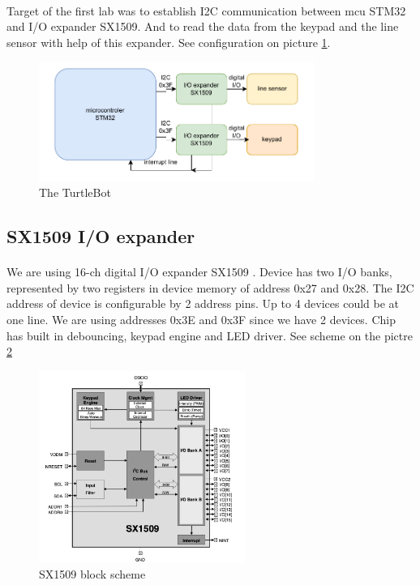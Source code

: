 \documentclass[english]{article}
\begin{document}
	\paragraph{}
	Target of the first lab was to establish I2C communication between mcu STM32 and I/O expander SX1509. And to read
	the data from the keypad and the line sensor with help of this expander. See configuration on picture \ref{fig.lab1.config}.

	\begin{figure}[H]
		\centering
		\includegraphics[width=0.8\textwidth]{figures/config_stm_lab1.pdf}
		\caption{The TurtleBot}
		\label{fig.lab1.config}
	\end{figure}

	\subsection{SX1509 I/O expander}

		\paragraph{}
		We are using 16-ch digital I/O expander SX1509 \cite{sx1509}. Device has two I/O banks, represented by two registers in device memory
		of address 0x27 and 0x28. The I2C address of device is configurable by 2 address pins. Up to 4 devices could be at one line. 
		We are using addresses 0x3E and 0x3F since we have 2 devices. Chip has built in debouncing, keypad engine and LED driver. See scheme on the pictre \ref{fig.lab1.sx1509}

		\begin{figure}[H]
			\centering
			\includegraphics[width=0.6\textwidth]{figures/sx1509.png}
			\caption{SX1509 block scheme}
			\label{fig.lab1.sx1509}
		\end{figure}
\end{document}
